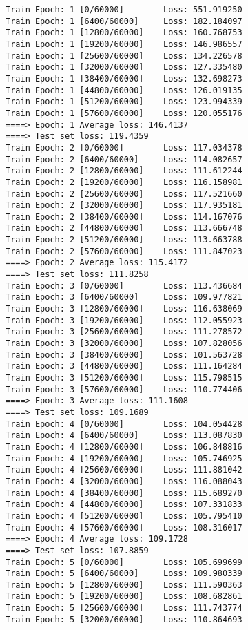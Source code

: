 \documentclass[11pt]{article}
\begin{document}
    \begin{Verbatim}[commandchars=\\\{\}]
Train Epoch: 1 [0/60000]        Loss: 551.919250
Train Epoch: 1 [6400/60000]     Loss: 182.184097
Train Epoch: 1 [12800/60000]    Loss: 160.768753
Train Epoch: 1 [19200/60000]    Loss: 146.986557
Train Epoch: 1 [25600/60000]    Loss: 134.226578
Train Epoch: 1 [32000/60000]    Loss: 127.335480
Train Epoch: 1 [38400/60000]    Loss: 132.698273
Train Epoch: 1 [44800/60000]    Loss: 126.019135
Train Epoch: 1 [51200/60000]    Loss: 123.994339
Train Epoch: 1 [57600/60000]    Loss: 120.055176
====> Epoch: 1 Average loss: 146.4137
====> Test set loss: 119.4359
Train Epoch: 2 [0/60000]        Loss: 117.034378
Train Epoch: 2 [6400/60000]     Loss: 114.082657
Train Epoch: 2 [12800/60000]    Loss: 111.612244
Train Epoch: 2 [19200/60000]    Loss: 116.158981
Train Epoch: 2 [25600/60000]    Loss: 117.521660
Train Epoch: 2 [32000/60000]    Loss: 117.935181
Train Epoch: 2 [38400/60000]    Loss: 114.167076
Train Epoch: 2 [44800/60000]    Loss: 113.666748
Train Epoch: 2 [51200/60000]    Loss: 113.663788
Train Epoch: 2 [57600/60000]    Loss: 111.847023
====> Epoch: 2 Average loss: 115.4172
====> Test set loss: 111.8258
Train Epoch: 3 [0/60000]        Loss: 113.436684
Train Epoch: 3 [6400/60000]     Loss: 109.977821
Train Epoch: 3 [12800/60000]    Loss: 116.638069
Train Epoch: 3 [19200/60000]    Loss: 112.055923
Train Epoch: 3 [25600/60000]    Loss: 111.278572
Train Epoch: 3 [32000/60000]    Loss: 107.828056
Train Epoch: 3 [38400/60000]    Loss: 101.563728
Train Epoch: 3 [44800/60000]    Loss: 111.164284
Train Epoch: 3 [51200/60000]    Loss: 115.798515
Train Epoch: 3 [57600/60000]    Loss: 110.774406
====> Epoch: 3 Average loss: 111.1608
====> Test set loss: 109.1689
Train Epoch: 4 [0/60000]        Loss: 104.054428
Train Epoch: 4 [6400/60000]     Loss: 113.087830
Train Epoch: 4 [12800/60000]    Loss: 106.848816
Train Epoch: 4 [19200/60000]    Loss: 105.746925
Train Epoch: 4 [25600/60000]    Loss: 111.881042
Train Epoch: 4 [32000/60000]    Loss: 116.088043
Train Epoch: 4 [38400/60000]    Loss: 115.689270
Train Epoch: 4 [44800/60000]    Loss: 107.331833
Train Epoch: 4 [51200/60000]    Loss: 105.795410
Train Epoch: 4 [57600/60000]    Loss: 108.316017
====> Epoch: 4 Average loss: 109.1728
====> Test set loss: 107.8859
Train Epoch: 5 [0/60000]        Loss: 105.699699
Train Epoch: 5 [6400/60000]     Loss: 109.980339
Train Epoch: 5 [12800/60000]    Loss: 111.590363
Train Epoch: 5 [19200/60000]    Loss: 108.682861
Train Epoch: 5 [25600/60000]    Loss: 111.743774
Train Epoch: 5 [32000/60000]    Loss: 110.864693

\end{Verbatim}
\end{document}
